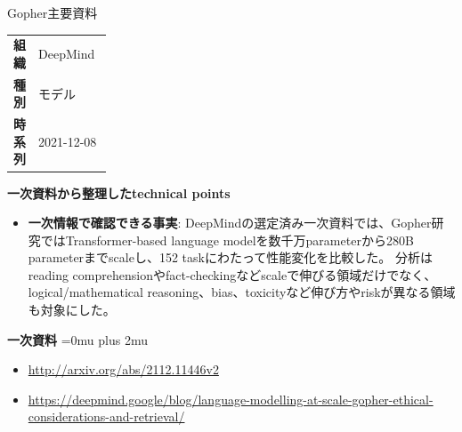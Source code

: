\begin{technicalnote}{Gopher}{主要資料}
\begingroup
\begin{tabularx}{\linewidth}{@{}>{\bfseries}p{0.22\linewidth}X@{}}
組織 & DeepMind \\
種別 & モデル \\
時系列 & 2021-12-08 \\
\end{tabularx}
\smallskip
{\bfseries 一次資料から整理したtechnical points}
\begin{itemize}[leftmargin=1.5em,itemsep=0.35em]
\item \textbf{一次情報で確認できる事実}: DeepMindの選定済み一次資料では、Gopher研究ではTransformer-based language modelを数千万parameterから280B parameterまでscaleし、152 taskにわたって性能変化を比較した。 分析はreading comprehensionやfact-checkingなどscaleで伸びる領域だけでなく、logical/mathematical reasoning、bias、toxicityなど伸び方やriskが異なる領域も対象にした。
\end{itemize}
\begin{minipage}{\linewidth}
\begin{samepage}
{\bfseries 一次資料}
\begingroup\sloppy
\Urlmuskip=0mu plus 2mu\relax
\begin{itemize}[leftmargin=1.5em,itemsep=0.25em]
\item {\scriptsize\url{http://arxiv.org/abs/2112.11446v2}}
\item {\scriptsize\url{https://deepmind.google/blog/language-modelling-at-scale-gopher-ethical-considerations-and-retrieval/}}
\end{itemize}
\endgroup
\end{samepage}
\end{minipage}
\endgroup
\end{technicalnote}
\medskip

